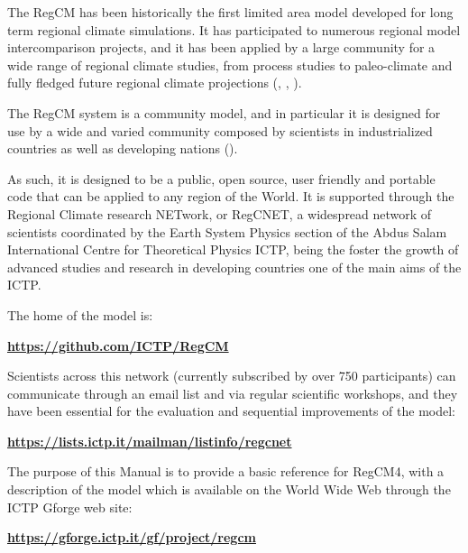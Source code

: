 The \ac{RegCM} has been historically the first limited area model
developed for long term regional climate simulations. It has participated to
numerous regional model intercomparison projects, and it has been applied by
a large community for a wide range of regional climate studies, from process
studies to paleo-climate and fully fledged future regional climate
projections (\cite{Giorgi_99}, \cite{Giorgi_06}, \cite{Giorgi_14}).

The \ac{RegCM} system is a community model, and in particular it is designed
for use by a wide and varied community composed by scientists in industrialized
countries as well as developing nations (\cite{Pal_07}).

As such, it is designed to be a public, open source, user friendly and portable
code that can be applied to any region of the World. It is supported through
the Regional Climate research NETwork, or RegCNET, a widespread network of
scientists coordinated by the Earth System Physics section of
the Abdus Salam International Centre for Theoretical Physics \ac{ICTP},
being the foster the growth of advanced studies and research in developing
countries one of the main aims of the \ac{ICTP}.

The home of the model is:

\begin{center}
	{\bf \url{https://github.com/ICTP/RegCM}}
\end{center}

Scientists across this network (currently subscribed by over 750 participants)
can communicate through an email list and via regular scientific workshops,
and they have been essential for the evaluation and sequential improvements of
the model:

\begin{center}
	{\bf \url{https://lists.ictp.it/mailman/listinfo/regcnet}}
\end{center}

The purpose of this Manual is to provide a basic reference for \ac{RegCM}4, with
a description of the model which is available on the World Wide Web through
the ICTP Gforge web site:

\begin{center}
	{\bf \url{https://gforge.ictp.it/gf/project/regcm}}
\end{center}

\vfill

